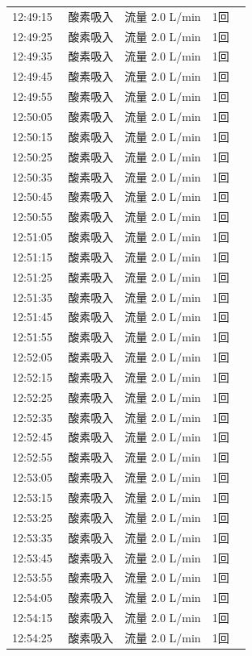 \documentclass[UTF8,10pt,a4paper,fontset=fandol]{ctexart}
\begin{document}
\begin{minipage}[t]{0.48\linewidth}
\begin{tabular}{@{}p{0.22\linewidth}p{0.72\linewidth}@{}}
12:49:15 & 酸素吸入　流量 2.0 L/min　1回\\
12:49:25 & 酸素吸入　流量 2.0 L/min　1回\\
12:49:35 & 酸素吸入　流量 2.0 L/min　1回\\
12:49:45 & 酸素吸入　流量 2.0 L/min　1回\\
12:49:55 & 酸素吸入　流量 2.0 L/min　1回\\
12:50:05 & 酸素吸入　流量 2.0 L/min　1回\\
12:50:15 & 酸素吸入　流量 2.0 L/min　1回\\
12:50:25 & 酸素吸入　流量 2.0 L/min　1回\\
12:50:35 & 酸素吸入　流量 2.0 L/min　1回\\
12:50:45 & 酸素吸入　流量 2.0 L/min　1回\\
12:50:55 & 酸素吸入　流量 2.0 L/min　1回\\
12:51:05 & 酸素吸入　流量 2.0 L/min　1回\\
12:51:15 & 酸素吸入　流量 2.0 L/min　1回\\
12:51:25 & 酸素吸入　流量 2.0 L/min　1回\\
12:51:35 & 酸素吸入　流量 2.0 L/min　1回\\
12:51:45 & 酸素吸入　流量 2.0 L/min　1回\\
12:51:55 & 酸素吸入　流量 2.0 L/min　1回\\
12:52:05 & 酸素吸入　流量 2.0 L/min　1回\\
12:52:15 & 酸素吸入　流量 2.0 L/min　1回\\
12:52:25 & 酸素吸入　流量 2.0 L/min　1回\\
12:52:35 & 酸素吸入　流量 2.0 L/min　1回\\
12:52:45 & 酸素吸入　流量 2.0 L/min　1回\\
12:52:55 & 酸素吸入　流量 2.0 L/min　1回\\
12:53:05 & 酸素吸入　流量 2.0 L/min　1回\\
12:53:15 & 酸素吸入　流量 2.0 L/min　1回\\
12:53:25 & 酸素吸入　流量 2.0 L/min　1回\\
12:53:35 & 酸素吸入　流量 2.0 L/min　1回\\
12:53:45 & 酸素吸入　流量 2.0 L/min　1回\\
12:53:55 & 酸素吸入　流量 2.0 L/min　1回\\
12:54:05 & 酸素吸入　流量 2.0 L/min　1回\\
12:54:15 & 酸素吸入　流量 2.0 L/min　1回\\
12:54:25 & 酸素吸入　流量 2.0 L/min　1回\\

\end{tabular}
\end{minipage}
\end{document}
